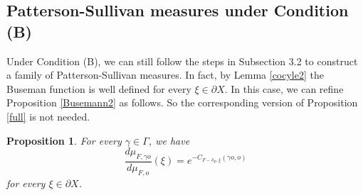 \documentclass[11pt]{amsart}
\newtheorem{proposition}[theorem]{Proposition}
\theoremstyle{definition}
\def\pX{{\partial X}}
\def\c{\gamma}   \def\C{\Gamma}
\def\d{\delta}   %
\begin{document}
\subsection{Patterson-Sullivan measures under Condition (B)}
Under Condition (B), we can still follow the steps in Subsection 3.2 to construct a family of Patterson-Sullivan measures. In fact, by Lemma \ref{cocyle2} the Buseman function is well defined for every $\xi\in \pX$. In this case, we can refine Proposition \ref{Busemann2} as follows. So the corresponding version of Proposition \ref{full} is not needed.

\begin{proposition}\label{Busemann3}
For every $\c\in \C$, we have
$$\frac{d\mu_{F,\c o}}{d\mu_{F,o}}(\xi)=e^{-C_{F-\d_F, \xi}(\c o,o)}$$
for every $\xi\in \pX$.
\end{proposition}
\end{document}
